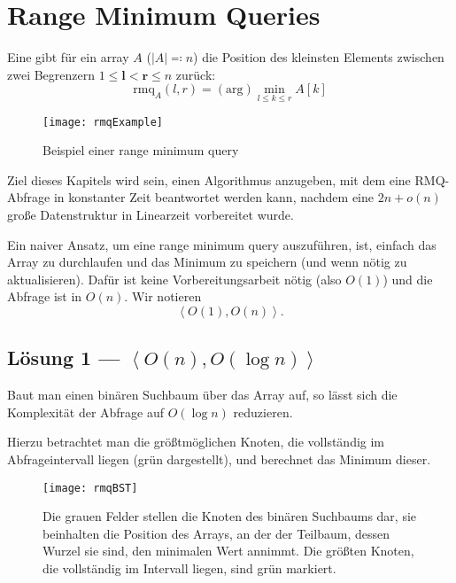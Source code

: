 \chapter{Range Minimum Queries}

Eine  gibt für ein array \( A \) (\( \left\vert A \right\vert \eqqcolon n \)) die Position des kleinsten Elements zwischen zwei Begrenzern \( 1 \leq \bm{l} < \bm{r} \leq n \) zurück:
\begin{equation*}
  \text{rmq}_A(l,r) = (\text{arg})\min_{l \leq k \leq r}A[k]
\end{equation*}

\begin{figure}[H]
  \texttt{[image: rmqExample]}
  \caption{Beispiel einer range minimum query}
\end{figure}

Ziel dieses Kapitels wird sein, einen Algorithmus anzugeben, mit dem eine RMQ-Abfrage in konstanter Zeit beantwortet werden kann, nachdem eine \( 2n + o(n) \) große Datenstruktur in Linearzeit vorbereitet wurde.

Ein naiver Ansatz, um eine range minimum query auszuführen, ist, einfach das Array zu durchlaufen und das Minimum zu speichern (und wenn nötig zu aktualisieren). Dafür ist keine Vorbereitungsarbeit nötig (also \( O(1) \)) und die Abfrage ist in \( O(n) \). Wir notieren
\begin{equation*}
  \left\langle O(1), O(n) \right\rangle\text{.}
\end{equation*}

\section{Lösung 1 --- \( \left\langle O(n), O(\log n) \right\rangle \)}

Baut man einen binären Suchbaum über das Array auf, so lässt sich die Komplexität der Abfrage auf \( O(\log n) \) reduzieren.

Hierzu betrachtet man die größtmöglichen Knoten, die vollständig im Abfrageintervall liegen (grün dargestellt), und berechnet das Minimum dieser.

\begin{figure}[H]
  \texttt{[image: rmqBST]}
  \caption{Die grauen Felder stellen die Knoten des binären Suchbaums dar, sie beinhalten die Position des Arrays, an der der Teilbaum, dessen Wurzel sie sind, den minimalen Wert annimmt. Die größten Knoten, die vollständig im Intervall liegen, sind grün markiert.}
\end{figure}

